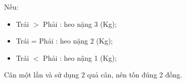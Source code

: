    Nếu:  
\begin{itemize}
	\item     Trái $>$ Phải : heo nặng 3 (Kg);   
	\item     Trái = Phải : heo nặng 2 (Kg);   
	\item     Trái $<$ Phải : heo nậng 1 (Kg);   
\end{itemize}
\begin{itemize}
\end{itemize}

   Cân một lần và sử dụng 2 quả cân, nên tốn đúng 2 đồng.  

